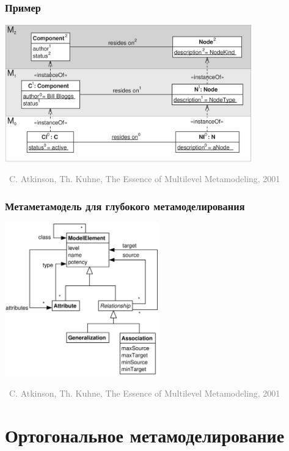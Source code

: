 \documentclass[xetex,mathserif,serif]{beamer}
\newcommand{\attribution}[1] {
\vspace{-5mm}\begin{flushright}\begin{scriptsize}\textcolor{gray}{\textcopyright\, #1}\end{scriptsize}\end{flushright}
}
\begin{document}
	\begin{frame}
		\frametitle{Пример}
		\begin{center}
			\includegraphics[width=0.8\textwidth]{deepComponents.png}
			\attribution{C. Atkinson, Th. Kuhne, The Essence of Multilevel Metamodeling, 2001}
		\end{center}
	\end{frame}

	\begin{frame}
		\frametitle{Метаметамодель для глубокого метамоделирования}
		\begin{center}
			\includegraphics[width=0.5\textwidth]{momm.png}
			\attribution{C. Atkinson, Th. Kuhne, The Essence of Multilevel Metamodeling, 2001}
		\end{center}
	\end{frame}

	\section{Ортогональное метамоделирование}
\end{document}
